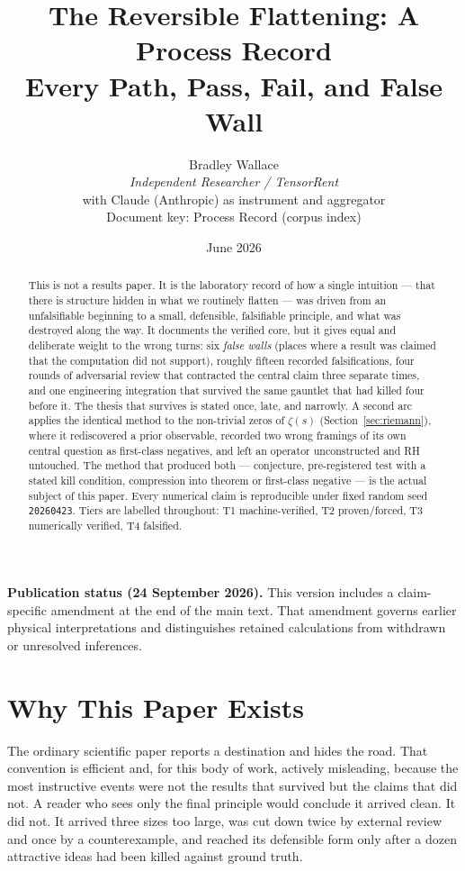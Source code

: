 \documentclass[11pt,a4paper]{article}
\title{\textbf{The Reversible Flattening: A Process Record}\\[0.45em]
\large Every Path, Pass, Fail, and False Wall}
\author{Bradley Wallace\\
\small \textit{Independent Researcher / TensorRent}\\
\small with Claude (Anthropic) as instrument and aggregator\\
\small Document key: \textsf{Process Record} (corpus index)}
\date{June 2026}
\newcommand{\seed}{\texttt{20260423}}
\newcommand{\TT}{\textsf{T1}}
\newcommand{\Tw}{\textsf{T2}}
\newcommand{\Th}{\textsf{T3}}
\newcommand{\Tf}{\textsf{T4}}
\theoremstyle{definition}
\theoremstyle{plain}
\begin{document}
\maketitle

\begin{abstract}
\noindent This is not a results paper. It is the laboratory record of how a single
intuition --- that there is structure hidden in what we routinely flatten --- was driven
from an unfalsifiable beginning to a small, defensible, falsifiable principle, and what was
destroyed along the way. It documents the verified core, but it gives equal and deliberate
weight to the wrong turns: six \emph{false walls} (places where a result was claimed that the
computation did not support), roughly fifteen recorded falsifications, four rounds of
adversarial review that contracted the central claim three separate times, and one engineering
integration that survived the same gauntlet that had killed four before it. The thesis that
survives is stated once, late, and narrowly. A second arc applies the identical method to the
non-trivial zeros of $\zeta(s)$ (Section~\ref{sec:riemann}), where it rediscovered a prior
observable, recorded two wrong framings of its own central question as first-class negatives, and
left an operator unconstructed and RH untouched. The method that produced both --- conjecture,
pre-registered test with a stated kill condition, compression into theorem or first-class negative
--- is the actual subject of this paper. Every numerical claim is reproducible under fixed random seed \seed.
Tiers are labelled throughout: \TT{} machine-verified, \Tw{} proven/forced, \Th{}
numerically verified, \Tf{} falsified.
\end{abstract}
\par\smallskip\noindent\textbf{Publication status (24 September 2026).}
This version includes a claim-specific amendment at the end of the main text.
That amendment governs earlier physical interpretations and distinguishes
retained calculations from withdrawn or unresolved inferences.\par\smallskip


\tableofcontents

\section{Why This Paper Exists}

The ordinary scientific paper reports a destination and hides the road. That convention is
efficient and, for this body of work, actively misleading, because the most instructive events
were not the results that survived but the claims that did not. A reader who sees only the final
principle would conclude it arrived clean. It did not. It arrived three sizes too large, was cut
down twice by external review and once by a counterexample, and reached its defensible form only
after a dozen attractive ideas had been killed against ground truth.
\end{document}
